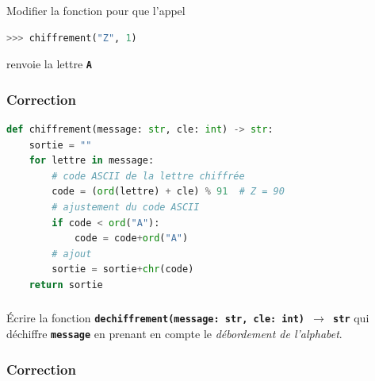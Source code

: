 \documentclass[svgnames,11pt]{beamer}
\begin{document}
\begin{frame}[fragile]
    \frametitle{}

    \begin{activite}
    Modifier la fonction pour que l'appel
\begin{center}
\begin{lstlisting}[language=Python , basicstyle=\ttfamily\small, xleftmargin=2em, xrightmargin=2em]
>>> chiffrement("Z", 1)
\end{lstlisting}
\end{center}
renvoie la lettre \textbf{\texttt{A}}
    \end{activite}

\end{frame}
\begin{frame}[fragile]
    \frametitle{Correction}

\begin{center}
\begin{lstlisting}[language=Python , basicstyle=\ttfamily\small, xleftmargin=0.2em, xrightmargin=0em]
def chiffrement(message: str, cle: int) -> str:
    sortie = ""
    for lettre in message:
        # code ASCII de la lettre chiffrée
        code = (ord(lettre) + cle) % 91  # Z = 90
        # ajustement du code ASCII
        if code < ord("A"):
            code = code+ord("A")
        # ajout
        sortie = sortie+chr(code)
    return sortie
\end{lstlisting}
\end{center}

\end{frame}
\begin{frame}
    \frametitle{}

    \begin{activite}
    Écrire la fonction \textbf{\texttt{dechiffrement(message: str, cle: int) $\rightarrow$ str}} qui déchiffre \textbf{\texttt{message}} en prenant en compte le \emph{débordement de l'alphabet}.
    \end{activite}

\end{frame}
\begin{frame}[fragile]
    \frametitle{Correction}

    

\end{frame}
\end{document}
